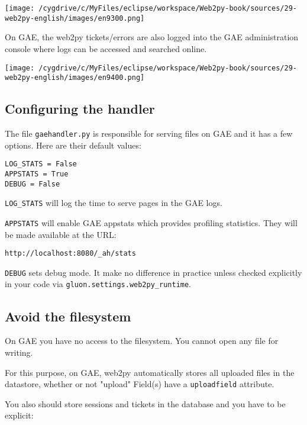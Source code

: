 \documentclass[justified,sixbynine,notoc]{tufte-book}
\def\ft{\small\tt}
\begin{document}
\begin{fullwidth}
\goodbreak\begin{center}\texttt{[image: /cygdrive/c/MyFiles/eclipse/workspace/Web2py-book/sources/29-web2py-english/images/en9300.png]}\end{center}


On GAE, the web2py tickets/errors are also logged into the GAE administration console where logs can be accessed and searched online.


\goodbreak\begin{center}\texttt{[image: /cygdrive/c/MyFiles/eclipse/workspace/Web2py-book/sources/29-web2py-english/images/en9400.png]}\end{center}


\goodbreak\subsection{Configuring the handler}

The file {\ft gaehandler.py} is responsible for serving files on GAE and it has a few options. Here are their default values:

\begin{lstlisting}
LOG_STATS = False
APPSTATS = True
DEBUG = False
\end{lstlisting}

{\ft LOG\_STATS} will log the time to serve pages in the GAE logs.

{\ft APPSTATS} will enable GAE appstats which provides profiling statistics. They will be made available at the URL:

\begin{lstlisting}[keywords={}]
http://localhost:8080/_ah/stats
\end{lstlisting}

{\ft DEBUG} sets debug mode. It make no difference in practice unless checked explicitly in your code via {\ft gluon.settings.web2py\_runtime}.

\goodbreak\subsection{Avoid the filesystem}

On GAE you have no access to the filesystem. You cannot open any file for writing.

For this purpose, on GAE, web2py automatically stores all uploaded files in the datastore, whether or not "upload" Field(s) have a {\ft uploadfield} attribute.

You also should store sessions and tickets in the database and you have to be explicit:


\end{fullwidth}
\end{document}
